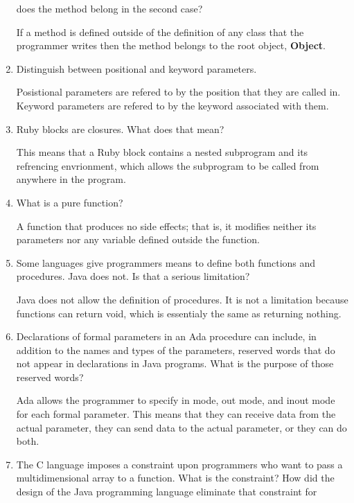 \begin{enumerate}
does the method belong in the second case?
\begin{answer}
If a method is defined outside of the definition of any class that the programmer writes then the method belongs to the root object, \textbf{Object}.
\end{answer}
\item Distinguish between positional and keyword parameters.
\begin{answer}
Posistional parameters are refered to by the position that they are called in. Keyword parameters are refered to by the keyword associated with them.
\end{answer}
\item Ruby blocks are closures. What does that mean?
\begin{answer}
This means that a Ruby block contains a nested subprogram and its refrencing envrionment, which allows the subprogram to be called from anywhere in the program.
\end{answer}
\item What is a pure function?
\begin{answer}
A function that produces no side effects; that is, it modifies neither its parameters nor any variable defined outside the function.
\end{answer}
\item Some languages give programmers means to define
both functions and procedures. Java does not. Is that
a serious limitation?
\begin{answer}
Java does not allow the definition of procedures. It is not a limitation because functions can return void, which is essentialy the same as returning nothing.
\end{answer}
\item Declarations of formal parameters in an Ada procedure
can include, in addition to the names and types of the
parameters, reserved words that do not appear in declarations
in Java programs.
What is the purpose of those reserved words?
\begin{answer}
Ada allows the programmer to specify in mode, out mode, and inout mode for each formal parameter. This means that they can receive data from the actual parameter, they can send data to the actual parameter, or they can do both.
\end{answer}
\item The C language imposes a constraint upon programmers
who want to pass a multidimensional array to a function.
What is the constraint? How did the design of the Java
programming language eliminate that constraint for

\end{enumerate}
